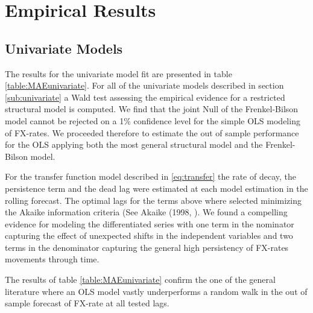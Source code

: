 \section{Empirical Results}
\label{sec:results}

\subsection{Univariate Models}

The results for the univariate model fit are presented in table \ref{table:MAEunivariate}.
For all of the univariate models described in section \ref{sub:univariate} a Wald test assessing the empirical evidence
for a restricted structural model is computed. We find
that the joint Null of the Frenkel-Bilson model cannot be rejected on a 1\% confidence level for the simple OLS modeling of FX-rates.
We proceeded therefore to estimate the out of sample performance for the OLS applying both the most
general structural model and the Frenkel-Bilson model.

For the transfer function model described in \ref{eq:transfer} the rate of decay, the persistence term and the dead lag were estimated at each model
estimation in the rolling forecast. The optimal lags for the terms above where selected minimizing the Akaike information criteria
(See Akaike (1998, \cite{Akaike}). We found a compelling evidence for modeling the differentiated series with one term in the nominator
capturing the effect of unexpected shifts in the independent variables and two terms in the denominator capturing the general
high persistency of FX-rates movements through time.

The results of table \ref{table:MAEunivariate} confirm the one of the general literature where an OLS model vastly underperforms a random walk
in the out of sample forecast of FX-rate at all tested lags.

